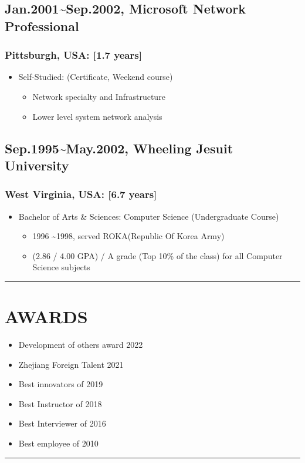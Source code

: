 \documentclass[12pt,a4paper]{article}
\begin{document}
\subsection{Jan.2001{\textasciitilde}Sep.2002, Microsoft Network Professional}
\subsubsection{Pittsburgh, USA: [1.7 years]}
\begin{itemize}
\item Self-Studied: (Certificate, Weekend course)

\begin{itemize}
\item Network specialty and Infrastructure


\item Lower level system network analysis

\end{itemize}
\end{itemize}
\subsection{Sep.1995{\textasciitilde}May.2002, Wheeling Jesuit University}
\subsubsection{West Virginia, USA: [6.7 years]}
\begin{itemize}
\item Bachelor of Arts \& Sciences: Computer Science (Undergraduate Course)

\begin{itemize}
\item 1996 {\textasciitilde}1998, served ROKA(Republic Of Korea Army) 


\item (2.86 / 4.00 GPA) / A grade (Top 10\% of the class) for all Computer Science subjects

\end{itemize}
\end{itemize}
\rule{\textwidth}{1pt}
\section{AWARDS}
\begin{itemize}
\item Development of others award 2022


\item Zhejiang Foreign Talent 2021


\item Best innovators of 2019


\item Best Instructor of 2018


\item Best Interviewer of 2016


\item Best employee of 2010

\end{itemize}
\rule{\textwidth}{1pt}
\end{document}
